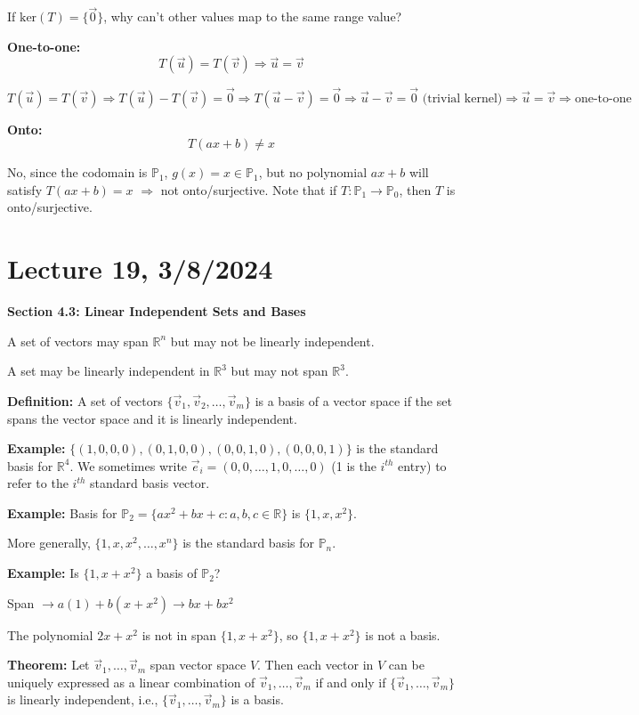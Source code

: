 \documentclass{article}
\begin{document}
If \( \text{ker}(T) = \{\vec{0}\} \), why can't other values map to the same range value?

\textbf{One-to-one:} 
\[ T(\vec{u}) = T(\vec{v}) \Rightarrow \vec{u} = \vec{v} \]

\[ T(\vec{u}) = T(\vec{v}) \Rightarrow T(\vec{u}) - T(\vec{v}) = \vec{0} \Rightarrow T(\vec{u} - \vec{v}) = \vec{0} \Rightarrow \vec{u} - \vec{v} = \vec{0} \text{ (trivial kernel)} \Rightarrow \vec{u} = \vec{v} \Rightarrow \text{one-to-one} \]

\textbf{Onto:} 
\[ T(ax+b) \neq x \]

No, since the codomain is \( \mathbb{P}_1 \), \( g(x) = x \in \mathbb{P}_1 \), but no polynomial \( ax+b \) will satisfy \( T(ax+b) = x \) $\Rightarrow$ not onto/surjective. Note that if \( T : \mathbb{P}_1 \to \mathbb{P}_0 \), then \( T \) is onto/surjective.


\section{Lecture 19, 3/8/2024}

\textbf{Section 4.3: Linear Independent Sets and Bases}

A set of vectors may span $\mathbb{R}^n$ but may not be linearly independent.

A set may be linearly independent in $\mathbb{R}^3$ but may not span $\mathbb{R}^3$.

\textbf{Definition:} A set of vectors $\{\vec{v}_1, \vec{v}_2, \ldots, \vec{v}_m\}$ is a basis of a vector space if the set spans the vector space and it is linearly independent.

\textbf{Example:} $\{(1,0,0,0),(0,1,0,0),(0,0,1,0),(0,0,0,1)\}$ is the standard basis for $\mathbb{R}^4$. We sometimes write $\vec{e}_i = (0,0,\ldots,1,0,\ldots,0)$ (1 is the $i^{th}$ entry) to refer to the $i^{th}$ standard basis vector.

\textbf{Example:} Basis for $\mathbb{P}_2 = \{ax^2+bx+c : a,b,c \in \mathbb{R}\}$ is $\{1,x,x^2\}$.


More generally, $\{1, x, x^2, \ldots, x^n\}$ is the standard basis for $\mathbb{P}_n$.

\textbf{Example:} Is $\{1, x+x^2\}$ a basis of $\mathbb{P}_2$?

Span $\rightarrow a(1) + b(x+x^2) \rightarrow bx+bx^2$

The polynomial $2x+x^2$ is not in span $\{1, x+x^2\}$, so $\{1, x+x^2\}$ is not a basis.

\textbf{Theorem:} Let $\vec{v}_1, \ldots, \vec{v}_m$ span vector space $V$. Then each vector in $V$ can be uniquely expressed as a linear combination of $\vec{v}_1, \ldots, \vec{v}_m$ if and only if $\{\vec{v}_1, \ldots, \vec{v}_m\}$ is linearly independent, i.e., $\{\vec{v}_1, \ldots, \vec{v}_m\}$ is a basis.
\end{document}
